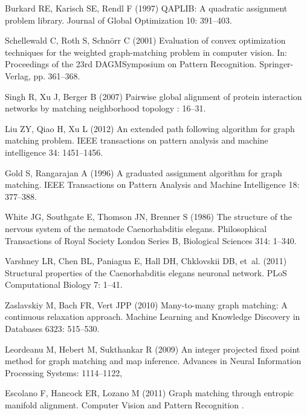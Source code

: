 \documentclass[10pt]{article}
\begin{document}
\begin{thebibliography}{10}
Burkard RE, Karisch SE, Rendl F (1997) {QAPLIB: A quadratic assignment problem
  library}.
\newblock Journal of Global Optimization 10: 391--403.

Schellewald C, Roth S, Schn\"{o}rr C (2001) {Evaluation of convex optimization
  techniques for the weighted graph-matching problem in computer vision}.
\newblock In: Proceedings of the 23rd DAGMSymposium on Pattern Recognition.
  Springer-Verlag, pp. 361--368.

Singh R, Xu J, Berger B (2007) Pairwise global alignment of protein interaction
  networks by matching neighborhood topology : 16--31.

Liu ZY, Qiao H, Xu L (2012) An extended path following algorithm for graph
  matching problem.
\newblock IEEE transactions on pattern analysis and machine intelligence 34:
  1451--1456.

Gold S, Rangarajan A (1996) {A graduated assignment algorithm for graph
  matching}.
\newblock IEEE Transactions on Pattern Analysis and Machine Intelligence 18:
  377--388.

White JG, Southgate E, Thomson JN, Brenner S (1986) {The structure of the
  nervous system of the nematode Caenorhabditis elegans.}
\newblock Philosophical Transactions of Royal Society London Series B,
  Biological Sciences 314: 1--340.

Varshney LR, Chen BL, Paniagua E, Hall DH, Chklovskii DB, et~al. (2011)
  {Structural properties of the Caenorhabditis elegans neuronal network}.
\newblock PLoS Computational Biology 7: 1--41.

Zaslavskiy M, Bach FR, Vert JPP (2010) Many-to-many graph matching: {A}
  continuous relaxation approach.
\newblock Machine Learning and Knowledge Discovery in Databases 6323: 515--530.

  Leordeanu M, Hebert M, Sukthankar R (2009) 
  {An integer projected fixed point method for graph matching and map inference}.
 \newblock Advances in Neural Information Processing Systems: 1114--1122,

Escolano F, Hancock ER, Lozano M (2011) Graph matching through entropic
  manifold alignment.
\newblock Computer Vision and Pattern Recognition .


\end{thebibliography}
\end{document}
